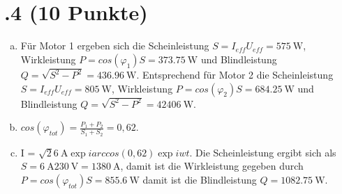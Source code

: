 \section*{\nr.4 \titfour (10 Punkte)}
\begin{enumerate}[(a)]
\item Für Motor 1 ergeben sich die Scheinleistung $S = I_{eff}U_{eff} = \SI{575}{\watt}$, Wirkleistung $P = cos(\varphi_1) S =\SI{373,75}{\watt}$ und Blindleistung $Q = \sqrt{S^2 - P^2} = \SI{436,96}{\watt}$.
Entsprechend für Motor 2 die Scheinleistung $S = I_{eff}U_{eff} = \SI{805}{\watt}$, Wirkleistung $P = cos(\varphi_2) S =\SI{684,25}{\watt}$ und Blindleistung $Q = \sqrt{S^2 - P^2} = \SI{42406}{\watt}$.
\item $cos(\varphi_{tot}) =\frac{P_1 + P_2}{S_1 + S_2} = 0,62$.
\item I = $\sqrt{2}\SI{6}{\ampere}\exp{iarccos(0,62)} \exp{iwt}$.
Die Scheinleistung ergibt sich als $S =\SI{6}{\ampere}\SI{230}{\volt} = \SI{1380}{\ampere}$, damit ist die Wirkleistung gegeben durch $P = cos(\varphi_{tot})S = \SI{855,6}{\watt}$ damit ist die Blindleistung $Q = \SI{1082,75}{\watt}$.
\end{enumerate}
